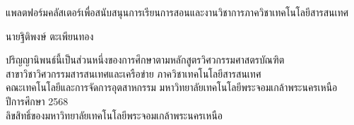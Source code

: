 \newpage
\thispagestyle{empty}
\begin{center}

\vspace*{-0.5in}

แพลตฟอร์มคลัสเตอร์เพื่อสนับสนุนการเรียนการสอนและงานวิชาการภาควิชาเทคโนโลยีสารสนเทศ     %

\vspace{0.1in}

\vspace{90mm}
นายฐิติพงษ์ ตะเพียนทอง %
\vspace{94mm}   

\vspace{0.1in}




ปริญญานิพนธ์นี้เป็นส่วนหนึ่งของการศึกษาตามหลักสูตรวิศวกรรมศาสตรบัณฑิต\\
สาขาวิชาวิศวกรรมสารสนเทศและเครือข่าย ภาควิชาเทคโนโลยีสารสนเทศ\\

คณะเทคโนโลยีและการจัดการอุตสาหกรรม มหาวิทยาลัยเทคโนโลยีพระจอมเกล้าพระนครเหนือ\\
ปีการศึกษา 2568\\
ลิขสิทธิ์ของมหาวิทยาลัยเทคโนโลยีพระจอมเกล้าพระนครเหนือ

\end{center}


